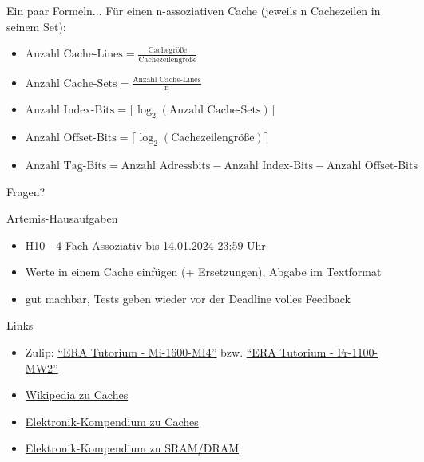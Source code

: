 \begin{frame}[c, fragile]{Ein paar Formeln$\ldots$}
	Für einen n-assoziativen Cache (jeweils n Cachezeilen in seinem Set):
	\vspace{0.25cm}
	\begin{itemize}
		\item $\textrm{Anzahl Cache-Lines}=\frac{\textrm{Cachegröße}}{\textrm{Cachezeilengröße}}$
		\item $\textrm{Anzahl Cache-Sets}=\frac{\textrm{Anzahl Cache-Lines}}{\textrm{n}}$
		\item $\textrm{Anzahl Index-Bits}=\lceil\log_2(\textrm{Anzahl Cache-Sets})\rceil$
		\item $\textrm{Anzahl Offset-Bits}=\lceil\log_2(\textrm{Cachezeilengröße})\rceil$
		\item $\textrm{Anzahl Tag-Bits}= \textrm{Anzahl Adressbits} - \textrm{Anzahl Index-Bits} - \textrm{Anzahl Offset-Bits}$
	\end{itemize}
\end{frame}


\begin{frame}[c]{}{}
	\begin{center}
		\LARGE Fragen?
	\end{center}
\end{frame}

\begin{frame}[c, fragile]{Artemis-Hausaufgaben}{}
	\begin{itemize}
		\item H10 - 4-Fach-Assoziativ bis 14.01.2024 23:59 Uhr
		\item Werte in einem Cache einfügen (+ Ersetzungen), Abgabe im Textformat
		\item gut machbar, Tests geben wieder vor der Deadline volles Feedback
	\end{itemize}
\end{frame}

\begin{frame}[fragile, c]{Links}{}
	\begin{itemize}
		\item Zulip: \href{https://zulip.in.tum.de/#narrow/stream/1917-ERA-Tutorium---Mi-1600-MI4}{\enquote{ERA Tutorium - Mi-1600-MI4}}
		      bzw. \href{https://zulip.in.tum.de/#narrow/stream/1940-ERA-Tutorium---Fr-1100-MW2}{\enquote{ERA Tutorium - Fr-1100-MW2}}
		\item \href{https://en.wikipedia.org/wiki/Cache_placement_policies}{Wikipedia zu Caches}
		\item \href{https://www.elektronik-kompendium.de/sites/com/0309291.htm}{Elektronik-Kompendium zu Caches}
		\item \href{https://www.elektronik-kompendium.de/sites/com/0309191.htm}{Elektronik-Kompendium zu SRAM/DRAM}
	\end{itemize}
\end{frame}

\maketitle


